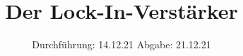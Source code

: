 

\subject{Versuch 303}
\title{Der Lock-In-Verstärker}
\date{%
  Durchführung: 14.12.21
  \hspace{3em}
  Abgabe: 21.12.21
}



\maketitle
\thispagestyle{empty}
\tableofcontents
\newpage






\nocite{*}
\printbibliography{}


